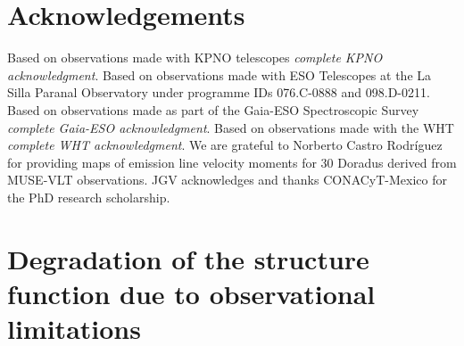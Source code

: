 \documentclass[fleqn,usenatbib, useAMS, a4paper]{mnras}
\begin{document}




\section*{Acknowledgements}

Based on observations made with KPNO telescopes
\textit{complete KPNO acknowledgment}.
Based on observations made with ESO Telescopes at the La Silla Paranal Observatory under programme IDs 076.C-0888 and 098.D-0211.
Based on observations made as part of the Gaia-ESO Spectroscopic Survey
\textit{complete Gaia-ESO acknowledgment}.
Based on observations made with the WHT
\textit{complete WHT acknowledgment}.
We are grateful to Norberto Castro Rodríguez for providing maps of emission line velocity moments for 30 Doradus derived from MUSE-VLT observations.
JGV acknowledges and thanks CONACyT-Mexico for the PhD research scholarship.







\appendix

\section{Degradation of the structure function due to observational limitations}
\label{sec:degr-struct-funct}
\end{document}
